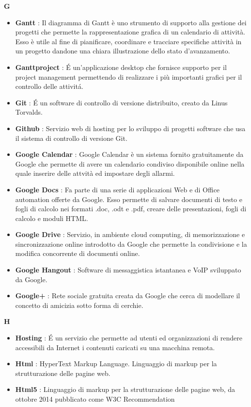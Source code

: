 \newpage
{\huge \textbf{G}}
\begin{flushleft}
\begin{itemize}[label={}]
\item \textbf{Gantt} : Il diagramma di Gantt è uno strumento di supporto alla gestione dei progetti che permette la rappresentazione grafica di un calendario di attività. Esso è utile al fine di pianificare, coordinare e tracciare specifiche attività in un progetto dandone una chiara illustrazione dello stato d'avanzamento.
\item \textbf{Ganttproject} : \'E un'applicazione desktop che fornisce supporto per il project management permettendo di realizzare i più importanti grafici per il controllo delle attivit\'a.
\item \textbf{Git} : \'E un software di controllo di versione distribuito, creato da Linus Torvalds.
\item \textbf{Github} : Servizio web di hosting per lo sviluppo di progetti software che usa il sistema di controllo di versione Git.
\item \textbf{Google Calendar} : Google Calendar è un sistema fornito gratuitamente da Google che permette di avere un calendario condiviso disponibile online nella quale inserire delle attvità ed impostare degli allarmi.
\item \textbf{Google Docs} : Fa parte di una serie di applicazioni Web e di Office automation offerte da Google. Esso permette di salvare documenti di testo e fogli di calcolo nei formati .doc, .odt e .pdf, creare delle presentazioni, fogli di calcolo e moduli HTML.
\item \textbf{Google Drive} : Servizio, in ambiente cloud computing, di memorizzazione e sincronizzazione online introdotto da Google che permette la condivisione e la modifica concorrente di documenti online.
\item \textbf{Google Hangout} : Software di messaggistica istantanea e VoIP sviluppato da Google.
\item \textbf{Google+} : Rete sociale gratuita creata da Google che cerca di modellare il concetto di amicizia sotto forma di cerchie.
\end{itemize}
\end{flushleft}
\newpage
{\huge \textbf{H}}
\begin{flushleft}
\begin{itemize}[label={}]
\item \textbf{Hosting} : \'E un servizio che permette ad utenti ed organizzazioni di rendere accessibili da Internet i contenuti caricati su una macchina remota.
\item \textbf{Html} : HyperText Markup Language. Linguaggio di markup per la strutturazione delle pagine web.
\item \textbf{Html5} : Linguaggio di markup per la strutturazione delle pagine web, da ottobre 2014 pubblicato come W3C Recommendation
\end{itemize}
\end{flushleft}
